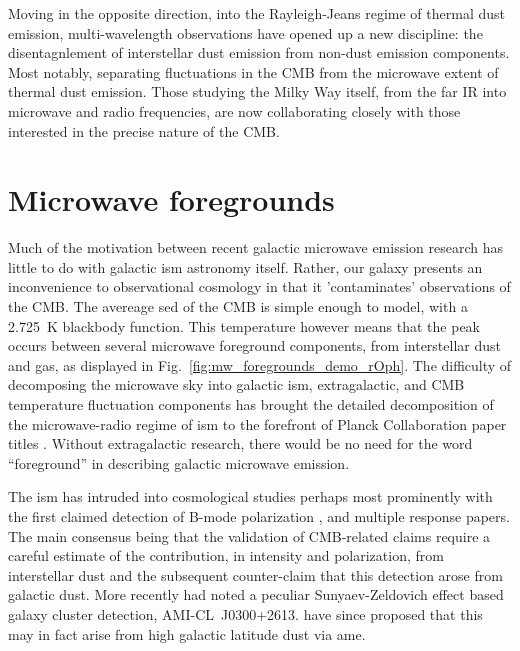     Moving in the opposite direction, into the Rayleigh-Jeans regime of thermal dust emission, multi-wavelength observations have opened up a new discipline: the disentagnlement of interstellar dust emission from non-dust emission components. Most notably, separating fluctuations in the \acrlong{CMB} from the microwave extent of thermal dust emission. Those studying the Milky Way itself, from the far IR into microwave and radio frequencies, are now collaborating closely with those interested in the precise nature of the CMB.

\section{Microwave foregrounds}

    Much of the motivation between recent galactic microwave emission research has little to do with galactic \acrshort{ism} astronomy itself. Rather, our galaxy presents an inconvenience to observational cosmology in that it 'contaminates' observations of the CMB. The avereage \acrshort{sed} of the CMB is simple enough to model, with a 2.725~K blackbody function. This temperature however means that the peak occurs between several microwave foreground components, from interstellar dust and gas, as displayed in Fig.~\ref{fig:mw_foregrounds_demo_rOph}. The difficulty of decomposing the microwave sky into galactic \acrshort{ism}, extragalactic, and CMB temperature fluctuation components has brought the detailed decomposition of the microwave-radio regime of \acrshort{ism} to the forefront of Planck Collaboration paper titles \citep{planckEarly11I,planck2013I,planck2015I}. Without extragalactic research, there would be no need for the word ``foreground'' in describing galactic microwave emission.

    The \acrshort{ism} has intruded into cosmological studies perhaps most prominently with the first claimed detection of B-mode polarization \citep{hanson13, bicep214, flauger14}, and multiple response papers. The main consensus being that the validation of CMB-related claims require a careful estimate of the contribution, in intensity and polarization, from interstellar dust and the subsequent counter-claim that this detection arose from galactic dust\citep{planckIntL17, sheehy17}. More recently \cite{shimwell12} had noted a peculiar Sunyaev-Zeldovich effect based galaxy cluster detection, AMI-CL~J0300+2613. \cite{perrott18} have since proposed that this may in fact arise from high galactic latitude dust via \acrlong{ame}.

